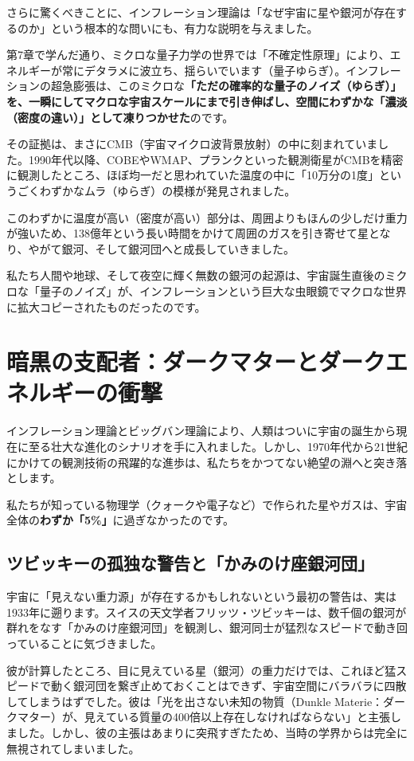さらに驚くべきことに、インフレーション理論は「なぜ宇宙に星や銀河が存在するのか」という根本的な問いにも、有力な説明を与えました。

第7章で学んだ通り、ミクロな量子力学の世界では「不確定性原理」により、エネルギーが常にデタラメに波立ち、揺らいでいます（量子ゆらぎ）。インフレーションの超急膨張は、このミクロな\textbf{「ただの確率的な量子のノイズ（ゆらぎ）」を、一瞬にしてマクロな宇宙スケールにまで引き伸ばし、空間にわずかな「濃淡（密度の違い）」として凍りつかせた}のです。

その証拠は、まさにCMB（宇宙マイクロ波背景放射）の中に刻まれていました。1990年代以降、COBEやWMAP、プランクといった観測衛星がCMBを精密に観測したところ、ほぼ均一だと思われていた温度の中に「10万分の1度」というごくわずかなムラ（ゆらぎ）の模様が発見されました。

このわずかに温度が高い（密度が高い）部分は、周囲よりもほんの少しだけ重力が強いため、138億年という長い時間をかけて周囲のガスを引き寄せて星となり、やがて銀河、そして銀河団へと成長していきました。

私たち人間や地球、そして夜空に輝く無数の銀河の起源は、宇宙誕生直後のミクロな「量子のノイズ」が、インフレーションという巨大な虫眼鏡でマクロな世界に拡大コピーされたものだったのです。

\section{暗黒の支配者：ダークマターとダークエネルギーの衝撃}

インフレーション理論とビッグバン理論により、人類はついに宇宙の誕生から現在に至る壮大な進化のシナリオを手に入れました。しかし、1970年代から21世紀にかけての観測技術の飛躍的な進歩は、私たちをかつてない絶望の淵へと突き落とします。

私たちが知っている物理学（クォークや電子など）で作られた星やガスは、宇宙全体の\textbf{わずか「5\%」}に過ぎなかったのです。

\subsection{ツビッキーの孤独な警告と「かみのけ座銀河団」}

宇宙に「見えない重力源」が存在するかもしれないという最初の警告は、実は1933年に遡ります。スイスの天文学者フリッツ・ツビッキーは、数千個の銀河が群れをなす「かみのけ座銀河団」を観測し、銀河同士が猛烈なスピードで動き回っていることに気づきました。

彼が計算したところ、目に見えている星（銀河）の重力だけでは、これほど猛スピードで動く銀河団を繋ぎ止めておくことはできず、宇宙空間にバラバラに四散してしまうはずでした。彼は「光を出さない未知の物質（Dunkle Materie：ダークマター）が、見えている質量の400倍以上存在しなければならない」と主張しました。しかし、彼の主張はあまりに突飛すぎたため、当時の学界からは完全に無視されてしまいました。

